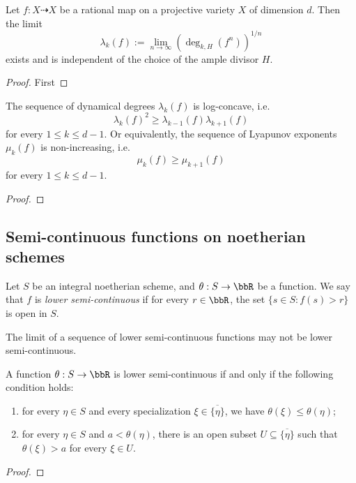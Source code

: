   \begin{proposition}
    Let $f: X \dashrightarrow X$ be a rational map on a projective variety $X$ of dimension $d$.
    Then the limit 
    \[ \lambda_k(f) := \lim_{n \to \infty} \left(\deg_{k,H}(f^n)\right)^{1/n} \]
    exists and is independent of the choice of the ample divisor $H$.
  \end{proposition}
  \begin{proof}
    First 

    \Yang{}
  \end{proof}

  \begin{proposition}
    The sequence of dynamical degrees $\lambda_k(f)$ is log-concave, i.e. 
    \[ \lambda_k(f)^2 \geq \lambda_{k-1}(f) \lambda_{k+1}(f)\] 
    for every $1 \leq k \leq d-1$.
    Or equivalently, the sequence of Lyapunov exponents $\mu_k(f)$ is non-increasing, i.e.
    \[ \mu_k(f) \geq \mu_{k+1}(f) \]
    for every $1 \leq k \leq d-1$.
  \end{proposition}
  \begin{proof}
    
    \Yang{}
  \end{proof}



  
\subsection{Semi-continuous functions on noetherian schemes}

  Let $S$ be an integral noetherian scheme, and $\theta: S \to \bbR$ be a function.
  We say that $f$ is \emph{lower semi-continuous} if for every $r \in \bbR$, the set $\{ s \in S : f(s) > r \}$ is open in $S$.

  \begin{remark}
    The limit of a sequence of lower semi-continuous functions may not be lower semi-continuous. 
    \Yang{}
  \end{remark}

  \begin{lemma}\label{lem:characterization_of_lower_semi-continuous_functions_on_noetherian_schemes}
    A function $\theta: S \to \bbR$ is lower semi-continuous if and only if the following condition holds: 
    \begin{enumerate}
      \item for every $\eta \in S$ and every specialization $\xi \in \overline{\{\eta\}}$, we have $\theta(\xi) \leq \theta(\eta)$;
      \item for every $\eta \in S$ and $a < \theta(\eta)$, there is an open subset $U \subseteq \overline{\{\eta\}}$ such that $\theta(\xi) > a$ for every $\xi \in U$.
    \end{enumerate}
  \end{lemma}
  \begin{proof}
    \Yang{}
  \end{proof}


